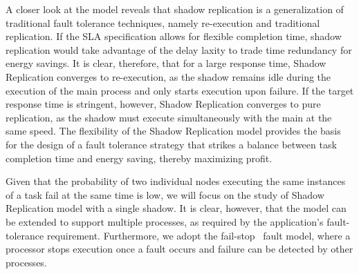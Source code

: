 A closer look at the model reveals that shadow
replication is a generalization of traditional fault tolerance
techniques, namely re-execution and traditional replication. If the
SLA specification allows for flexible completion time, shadow
replication would take advantage of the delay laxity to trade time
redundancy for energy savings. It is clear, therefore, that for a
large response time, Shadow Replication converges to re-execution, as
the shadow remains idle during the execution of the main process and
only starts execution upon failure. If the target response time is
stringent, however, Shadow Replication converges to pure replication,
as the shadow must execute simultaneously with the main at the same
speed. The flexibility of the Shadow Replication model provides the
basis for the design of a fault tolerance strategy that strikes a
balance between task completion time and energy saving, thereby
maximizing profit.

Given that the probability of two individual nodes executing the same
instances of a task fail at the same time is low, we will focus on the study of Shadow Replication model with a single shadow. It is clear, however, that the model can
be extended to support multiple processes, as required by the
application's fault-tolerance requirement. Furthermore, we adopt the
fail-stop~ fault model, where a processor stops execution once a fault
occurs and failure can be detected by other
processes\cite{gartner_faults_1999,cristian_comm_1991}.









